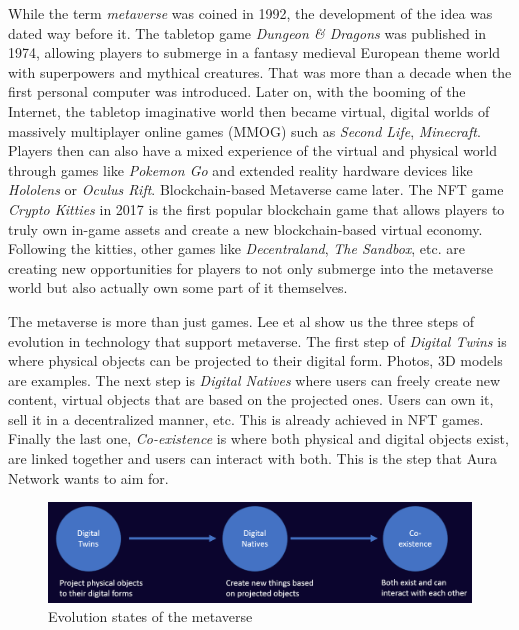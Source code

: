 \documentclass[12pt, titlepage]{article}
\begin{document}
While the term \emph{metaverse} was coined in 1992, the development of the idea was dated way before it. The tabletop game \emph{Dungeon \& Dragons} was published in 1974, allowing players to submerge in a fantasy medieval European theme world with superpowers and mythical creatures. That was more than a decade when the first personal computer was introduced. Later on, with the booming of the Internet, the tabletop imaginative world then became virtual, digital worlds of massively multiplayer online games (MMOG) such as \emph{Second Life}, \emph{Minecraft}. Players then can also have a mixed experience of the virtual and physical world through games like \emph{Pokemon Go} and extended reality hardware devices like \emph{Hololens} or \emph{Oculus Rift}. Blockchain-based Metaverse came later. The NFT game \emph{Crypto Kitties} in 2017 is the first popular blockchain game that allows players to truly own in-game assets and create a new blockchain-based virtual economy. Following the kitties, other games like \emph{Decentraland}, \emph{The Sandbox}, etc. are creating new opportunities for players to not only submerge into the metaverse world but also actually own some part of it themselves.

The metaverse is more than just games. Lee et al \cite{lee2021all} show us the three steps of evolution in technology that support metaverse. The first step of \emph{Digital Twins} is where physical objects can be projected to their digital form. Photos, 3D models are examples. The next step is \emph{Digital Natives} where users can freely create new content, virtual objects that are based on the projected ones. Users can own it, sell it in a decentralized manner, etc. This is already achieved in NFT games. Finally the last one, \emph{Co-existence} is where both physical and digital objects exist, are linked together and users can interact with both. This is the step that Aura Network wants to aim for.   

\begin{figure}[ht]
\label{fig:metaverse}
\includegraphics[width=14cm]{img/metaverse.png}
\centering
\caption{Evolution states of the metaverse \cite{lee2021all}}
\end{figure}
\end{document}
